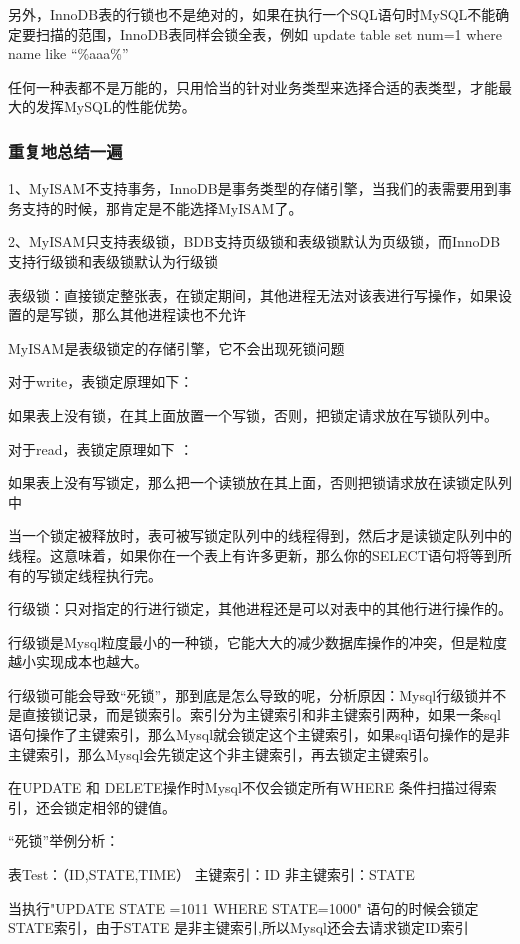 \documentclass[UTF8]{ctexart}
\begin{document}
另外，InnoDB表的行锁也不是绝对的，如果在执行一个SQL语句时MySQL不能确定要扫描的范围，InnoDB表同样会锁全表，例如 update table set num=1 where name like “\%aaa\%”  

任何一种表都不是万能的，只用恰当的针对业务类型来选择合适的表类型，才能最大的发挥MySQL的性能优势。   

 
\subsubsection{重复地总结一遍}

1、MyISAM不支持事务，InnoDB是事务类型的存储引擎，当我们的表需要用到事务支持的时候，那肯定是不能选择MyISAM了。

2、MyISAM只支持表级锁，BDB支持页级锁和表级锁默认为页级锁，而InnoDB支持行级锁和表级锁默认为行级锁
 
表级锁：直接锁定整张表，在锁定期间，其他进程无法对该表进行写操作，如果设置的是写锁，那么其他进程读也不允许
 
MyISAM是表级锁定的存储引擎，它不会出现死锁问题
 
对于write，表锁定原理如下：
 
如果表上没有锁，在其上面放置一个写锁，否则，把锁定请求放在写锁队列中。
 
对于read，表锁定原理如下 ：
 
如果表上没有写锁定，那么把一个读锁放在其上面，否则把锁请求放在读锁定队列中
 
当一个锁定被释放时，表可被写锁定队列中的线程得到，然后才是读锁定队列中的线程。这意味着，如果你在一个表上有许多更新，那么你的SELECT语句将等到所有的写锁定线程执行完。

行级锁：只对指定的行进行锁定，其他进程还是可以对表中的其他行进行操作的。
 
行级锁是Mysql粒度最小的一种锁，它能大大的减少数据库操作的冲突，但是粒度越小实现成本也越大。
 
行级锁可能会导致“死锁”，那到底是怎么导致的呢，分析原因：Mysql行级锁并不是直接锁记录，而是锁索引。索引分为主键索引和非主键索引两种，如果一条sql语句操作了主键索引，那么Mysql就会锁定这个主键索引，如果sql语句操作的是非主键索引，那么Mysql会先锁定这个非主键索引，再去锁定主键索引。
 
在UPDATE 和 DELETE操作时Mysql不仅会锁定所有WHERE 条件扫描过得索引，还会锁定相邻的键值。
 
“死锁”举例分析：
 
表Test：（ID,STATE,TIME）  主键索引：ID  非主键索引：STATE
 
当执行"UPDATE  STATE =1011 WHERE STATE=1000"  语句的时候会锁定STATE索引，由于STATE 是非主键索引,所以Mysql还会去请求锁定ID索引
 
\end{document}
